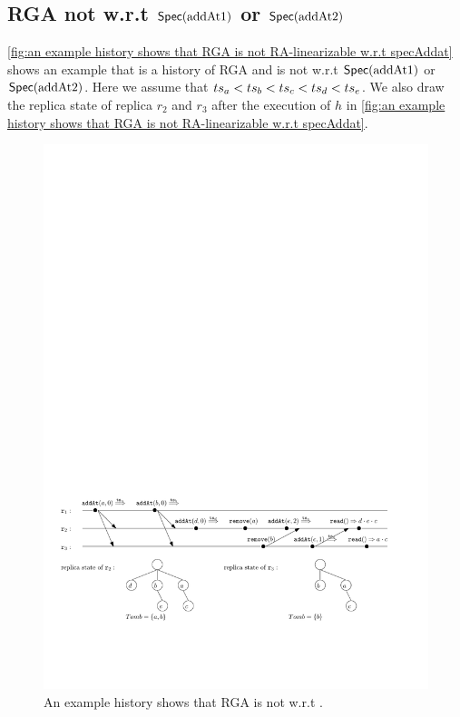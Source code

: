 \subsection{RGA not \crdtlinearizable{} w.r.t $\mathsf{Spec}(\text{addAt1})$ or $\mathsf{Spec}(\text{addAt2})$}
\label{subsec:RGA not RA-linearizable w.r.t specAddatOne or SpecAddatTwo}

\autoref{fig:an example history shows that RGA is not RA-linearizable w.r.t specAddat} shows an example that is a history of RGA and is not \crdtlinearizable{} w.r.t $\mathsf{Spec}(\text{addAt1})$ or $\mathsf{Spec}(\text{addAt2})$. Here we assume that $ts_a < ts_b < ts_c < ts_d < ts_e$. We also draw the replica state of replica $r_2$ and $r_3$ after the execution of $h$ in \autoref{fig:an example history shows that RGA is not RA-linearizable w.r.t specAddat}.


\begin{figure}[!h]
  \centering
  \includegraphics[width=0.9 \textwidth]{figures/RGAwithaddAtNotRALin.pdf}
\vspace{-10pt}
  \caption{An example history shows that RGA is not \crdtlinearizable{} w.r.t .}
  \label{fig:an example history shows that RGA is not RA-linearizable w.r.t specAddat}
\end{figure}

